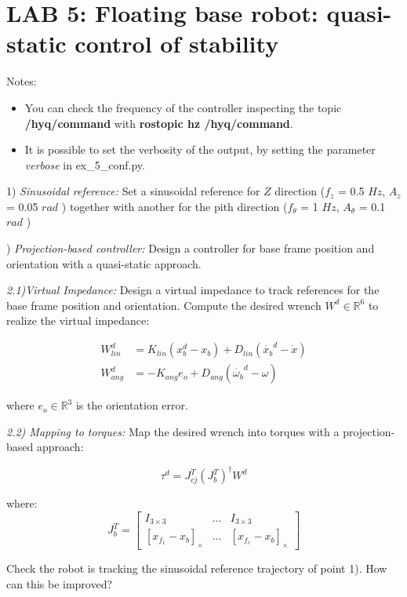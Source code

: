 \documentclass{report}
\newcommand{\Rnum}{\mathbb{R}} %
\newcommand{\mat}[1]{\ensuremath{\begin{bmatrix}#1\end{bmatrix}}}	%
\begin{document}
\section*{LAB 5: Floating base robot: quasi-static control of stability}

Notes:
\begin{itemize}
	\item You can check the frequency of the controller inspecting the topic \textbf{/hyq/command} with \textbf{rostopic hz /hyq/command}.
	\item It is possible to set the verbosity of the output, by setting the parameter  \textit{verbose} in  ex\_5\_conf.py.
\end{itemize}

1) \textit{Sinusoidal reference:} 
Set a sinusoidal reference for $Z$ direction ($f_z$ = 0.5 $Hz$, $A_z$ = 0.05 $rad$ )
together with another for the pith direction ($f_{\theta}$ = 1 $Hz$, $A_{\theta}$ = 0.1 $rad$ )

\quad
 
) \textit{Projection-based controller:} 
Design a controller for base frame position and orientation with a quasi-static approach.

 \textit{2.1)Virtual Impedance:}
Design a virtual impedance to track  references for the base frame position and orientation. Compute the desired wrench $W^d \in\Rnum^6$ to realize the virtual impedance:

\begin{align}
W^d_{lin} &= K_{lin} (x^d_b - x_b ) + D_{lin} (\dot{x_b}^d - \dot{x})   \\
W^d_{ang} &=  - K_{ang} e_o + D_{ang} (\dot{\omega_b}^d - \omega)
\end{align}

where $e_o \in \Rnum^3$ is the orientation error. 

\textit{2.2) Mapping to torques:}
Map the desired wrench into torques  with a projection-based approach:

\begin{equation}
\tau^d = J_{cj}^T(J_b^T)^{\dagger} W^d
\end{equation}

where:
\begin{equation}
J_b^T = \mat{I_{3\times3} & \dots & I_{3\times3} \\
			[x_{f_1} - x_b]_{\times} & \dots & [x_{f_c} - x_b]_{\times}}
\end{equation}

Check the robot is tracking the sinusoidal reference trajectory of point 1). How can this be improved? 
\end{document}

